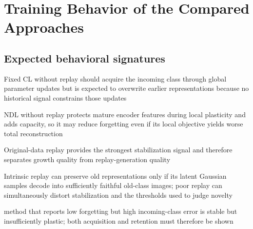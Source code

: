 \section{Training Behavior of the Compared Approaches}

\subsection{Expected behavioral signatures}
\begin{draftpoints}
  \item Fixed CL without replay should acquire the incoming class through global parameter updates but is expected to overwrite earlier representations because no historical signal constrains those updates
  \item NDL without replay protects mature encoder features during local plasticity and adds capacity, so it may reduce forgetting even if its local objective yields worse total reconstruction
  \item Original-data replay provides the strongest stabilization signal and therefore separates growth quality from replay-generation quality
  \item Intrinsic replay can preserve old representations only if its latent Gaussian samples decode into sufficiently faithful old-class images; poor replay can simultaneously distort stabilization and the thresholds used to judge novelty
  \item method that reports low forgetting but high incoming-class error is stable but insufficiently plastic; both acquisition and retention must therefore be shown
\end{draftpoints}

